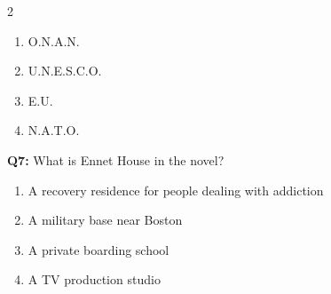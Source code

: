 \documentclass[10pt]{article}
\begin{document}
\begin{multicols}{2}
\begin{enumerate}[label=\arabic*.]
\item O.N.A.N.
\item U.N.E.S.C.O.
\item E.U.
\item N.A.T.O.
\end{enumerate}
\textbf{Q7:} What is Ennet House in the novel?

\begin{enumerate}[label=\arabic*.]
\item A recovery residence for people dealing with addiction
\item A military base near Boston
\item A private boarding school
\item A TV production studio
\end{enumerate}
\end{multicols}

\newpage
\end{document}
